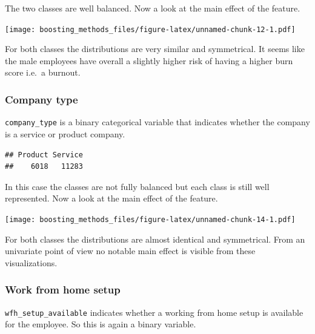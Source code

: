 \documentclass[
]{book}
\newenvironment{Shaded}{\begin{snugshade}}{\end{snugshade}}
\newcommand{\CommentTok}[1]{\textcolor[rgb]{0.56,0.35,0.01}{\textit{#1}}}
\newcommand{\FunctionTok}[1]{\textcolor[rgb]{0.00,0.00,0.00}{#1}}
\newcommand{\NormalTok}[1]{#1}
\newcommand{\SpecialCharTok}[1]{\textcolor[rgb]{0.00,0.00,0.00}{#1}}
\begin{document}
The two classes are well balanced. Now a look at the main effect of the feature.

\texttt{[image: boosting\_methods\_files/figure-latex/unnamed-chunk-12-1.pdf]}

For both classes the distributions are very similar and symmetrical. It seems like the male employees have overall a slightly higher risk of having a higher burn score i.e.~a burnout.

\hypertarget{company-type}{%
\subsubsection{Company type}\label{company-type}}

\texttt{company\_type} is a binary categorical variable that indicates whether the company is a service or product company.

\begin{Shaded}
\end{Shaded}

\begin{verbatim}
## Product Service 
##    6018   11283
\end{verbatim}

In this case the classes are not fully balanced but each class is still well represented. Now a look at the main effect of the feature.

\texttt{[image: boosting\_methods\_files/figure-latex/unnamed-chunk-14-1.pdf]}

For both classes the distributions are almost identical and symmetrical. From an univariate point of view no notable main effect is visible from these visualizations.

\hypertarget{work-from-home-setup}{%
\subsubsection{Work from home setup}\label{work-from-home-setup}}

\texttt{wfh\_setup\_available} indicates whether a working from home setup is available for the employee. So this is again a binary variable.

\begin{Shaded}
\end{Shaded}
\end{document}
